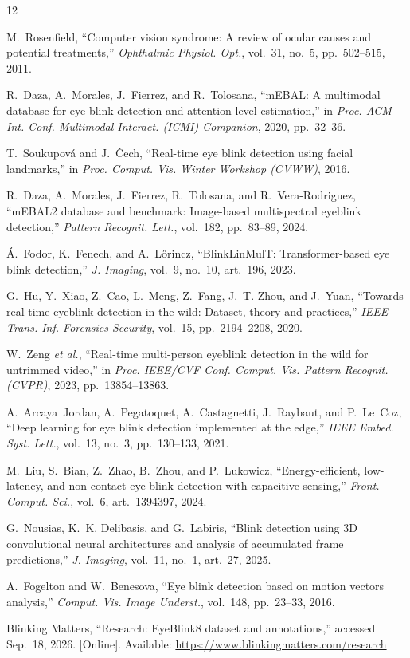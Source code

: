 \documentclass{IEEEmce}
\begin{document}
\renewcommand{\bibliofont}{\fontfamily{\sfdefault}\fontsize{8}{11.5}\selectfont\raggedright}
\begin{thebibliography}{12}

M.~Rosenfield, ``Computer vision syndrome: A review of ocular causes and potential
treatments,'' \emph{Ophthalmic Physiol. Opt.}, vol.~31, no.~5, pp.~502--515, 2011.

R.~Daza, A.~Morales, J.~Fierrez, and R.~Tolosana, ``mEBAL: A multimodal database for eye
blink detection and attention level estimation,'' in \emph{Proc. ACM Int. Conf.
Multimodal Interact. (ICMI) Companion}, 2020, pp.~32--36.

T.~Soukupov\'{a} and J.~\v{C}ech, ``Real-time eye blink detection using facial
landmarks,'' in \emph{Proc. Comput. Vis. Winter Workshop (CVWW)}, 2016.

R.~Daza, A.~Morales, J.~Fierrez, R.~Tolosana, and R.~Vera-Rodriguez, ``mEBAL2 database
and benchmark: Image-based multispectral eyeblink detection,'' \emph{Pattern Recognit.
Lett.}, vol.~182, pp.~83--89, 2024.

\'{A}.~Fodor, K.~Fenech, and A.~L\H{o}rincz, ``BlinkLinMulT: Transformer-based eye blink
detection,'' \emph{J. Imaging}, vol.~9, no.~10, art.~196, 2023.

G.~Hu, Y.~Xiao, Z.~Cao, L.~Meng, Z.~Fang, J.~T. Zhou, and J.~Yuan, ``Towards real-time eyeblink
detection in the wild: Dataset, theory and practices,'' \emph{IEEE Trans. Inf. Forensics
Security}, vol.~15, pp.~2194--2208, 2020.

W.~Zeng \textit{et al.}, ``Real-time multi-person eyeblink detection in the wild for
untrimmed video,'' in \emph{Proc. IEEE/CVF Conf. Comput. Vis. Pattern Recognit. (CVPR)},
2023, pp.~13854--13863.

A.~Arcaya~Jordan, A.~Pegatoquet, A.~Castagnetti, J.~Raybaut, and P.~Le~Coz, ``Deep
learning for eye blink detection implemented at the edge,'' \emph{IEEE Embed. Syst.
Lett.}, vol.~13, no.~3, pp.~130--133, 2021.

M.~Liu, S.~Bian, Z.~Zhao, B.~Zhou, and P.~Lukowicz, ``Energy-efficient, low-latency, and
non-contact eye blink detection with capacitive sensing,'' \emph{Front. Comput. Sci.},
vol.~6, art.~1394397, 2024.

G.~Nousias, K.~K. Delibasis, and G.~Labiris, ``Blink detection using 3D convolutional
neural architectures and analysis of accumulated frame predictions,'' \emph{J. Imaging},
vol.~11, no.~1, art.~27, 2025.

A.~Fogelton and W.~Benesova, ``Eye blink detection based on motion vectors analysis,''
\emph{Comput. Vis. Image Underst.}, vol.~148, pp.~23--33, 2016.

Blinking Matters, ``Research: EyeBlink8 dataset and annotations,'' accessed Sep.~18, 2026.
[Online]. Available: \url{https://www.blinkingmatters.com/research}

\end{thebibliography}
\end{document}
